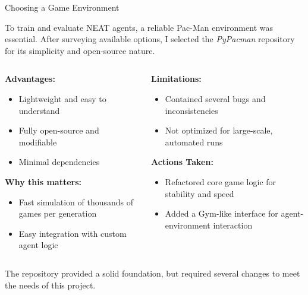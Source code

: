 \begin{frame}{Choosing a Game Environment}
	
	To train and evaluate NEAT agents, a reliable Pac-Man environment was essential. After surveying available options, I selected the \textit{PyPacman} repository~\cite{pypacman} for its simplicity and open-source nature.

	\vspace{0.5em}
	\begin{columns}[T]
		\begin{column}{0.48\textwidth}
			\textbf{Advantages:}
			\begin{itemize}
				\item Lightweight and easy to understand
				\item Fully open-source and modifiable
				\item Minimal dependencies
			\end{itemize}
			\textbf{Why this matters:}
			\begin{itemize}
				\item Fast simulation of thousands of games per generation
				\item Easy integration with custom agent logic
			\end{itemize}
		\end{column}
		\begin{column}{0.48\textwidth}
			\textbf{Limitations:}
			\begin{itemize}
				\item Contained several bugs and inconsistencies
				\item Not optimized for large-scale, automated runs
			\end{itemize}
			\textbf{Actions Taken:}
			\begin{itemize}
				\item Refactored core game logic for stability and speed
				\item Added a Gym-like interface for agent-environment interaction
			\end{itemize}
		\end{column}
	\end{columns}

	The repository provided a solid foundation, but required several changes to meet the needs of this project.

\end{frame}